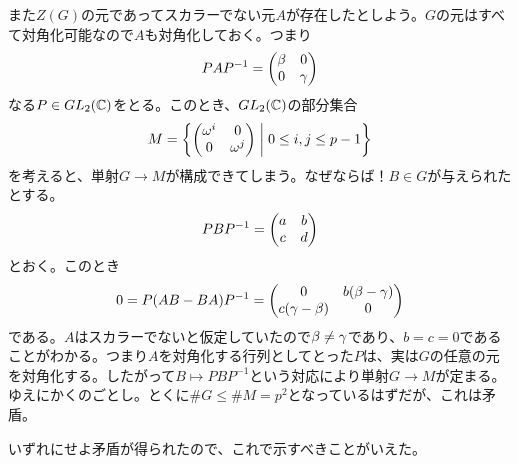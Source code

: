 \begin{sol}
また$Z(G)$の元であってスカラーでない元$A$が存在したとしよう。$G$の元はすべて対角化可能なので$A$も対角化しておく。つまり
\[
PAP^{-1} = \begin{pmatrix}  \beta & 0 \\ 0 & {\gamma} \end{pmatrix}
\]
なる$P \in GL_2({\mathbb C})$をとる。このとき、$GL_2({\mathbb C})$の部分集合
\[
M = \left\{  \begin{pmatrix}  {\omega}^i & 0 \\ 0 & {\omega}^j  \end{pmatrix}  \mathrel{} \middle| \mathrel{}  0 \leq i,j \leq p-1 \right\}
\]
を考えると、単射$G \to M$が構成できてしまう。なぜならば！$B \in G$が与えられたとする。
\[
PBP^{-1} = \begin{pmatrix}  a & b \\ c & d \end{pmatrix}
\]
とおく。このとき
\[
0 = P(AB - BA)P^{-1} = \begin{pmatrix}  0 & b(\beta - {\gamma}) \\ c({\gamma} - \beta) & 0 \end{pmatrix}
\]
である。$A$はスカラーでないと仮定していたので$\beta \neq {\gamma}$であり、$b = c=0$であることがわかる。つまり$A$を対角化する行列としてとった$P$は、実は$G$の任意の元を対角化する。したがって$B \mapsto PBP^{-1}$という対応により単射$G \to M$が定まる。ゆえにかくのごとし。とくに$\# G \leq \# M = p^2$となっているはずだが、これは矛盾。

いずれにせよ矛盾が得られたので、これで示すべきことがいえた。
\end{sol}
